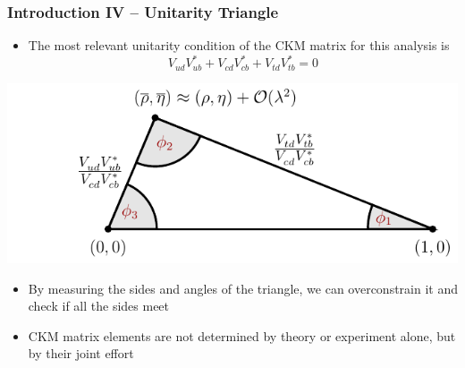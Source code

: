 \documentclass[serif]{beamer}
\begin{document}
\begin{frame}[t]
\frametitle{Introduction IV -- Unitarity Triangle}
\small
\vspace{-3mm}
\begin{block}{}
	\begin{itemize}
		\item The most relevant unitarity condition of the CKM matrix for this analysis is
		$$V_{ud}V_{ub}^{*}+V_{cd}V_{cb}^{*}+V_{td}V_{tb}^{*} = 0$$
	\end{itemize}
\end{block}

\begin{center}
	\includegraphics[scale=0.8]{texfig/UT_Triangle}
\end{center}
\vspace{-2mm}
\begin{block}{}
\begin{itemize}
	\item By measuring the sides and angles of the triangle, we can overconstrain it and check if all the sides meet
	\item CKM matrix elements are not determined by theory or experiment alone, but by their joint effort
\end{itemize}
\end{block}

\end{frame}

\end{document}
